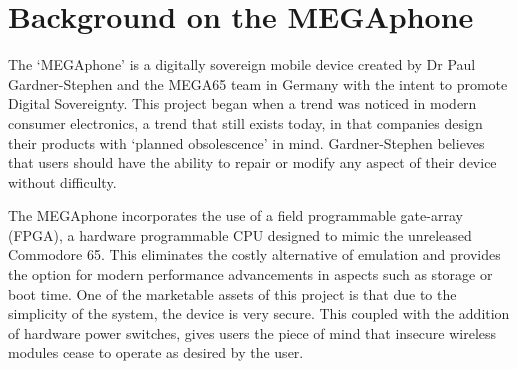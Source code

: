 

\section{Background on the MEGAphone} %

The ‘MEGAphone’ is a digitally sovereign mobile device created by Dr Paul Gardner-Stephen and the MEGA65 team in Germany with the intent to promote Digital Sovereignty\cite{mega65}.
This project began when a trend was noticed in modern consumer electronics, a trend that still exists today, in that companies design their products with ‘planned obsolescence’ in mind. 
Gardner-Stephen believes that users should have the ability to repair or modify any aspect of their device without difficulty\cite{mobilehistory}.

The MEGAphone incorporates the use of a field programmable gate-array (FPGA), a hardware programmable CPU designed to mimic the unreleased Commodore 65.
This eliminates the costly alternative of emulation and provides the option for modern performance advancements in aspects such as storage or boot time.
One of the marketable assets of this project is that due to the simplicity of the system, the device is very secure.
This coupled with the addition of hardware power switches, gives users the piece of mind that insecure wireless modules cease to operate as desired by the user.

